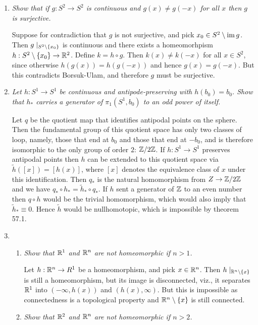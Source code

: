 \documentclass[10pt]{article}
\begin{document}
\begin{enumerate}
\item \emph{Show that if $g: S^2 \rightarrow S^2$ is continuous and $g(x) \neq g(-x)$ for all $x$ then $g$ is surjective.}

Suppose for contradiction that $g$ is not surjective, and pick $x_0 \in S^2 \setminus \operatorname{im} g$.  Then $g \mid_{S^2 \setminus \left\{ x_0 \right\}}$ is continuous and there exists a homeomorhpism $h: S^2 \setminus \left\{ x_0 \right\} \rightarrow \mathbb{R}^2$.  Define $k = h \circ g$.  Then $k(x) \neq k(-x)$ for all $x \in S^2$, since otherwise $h(g(x)) = h(g(-x))$ and hence $g(x) = g(-x)$.  But this contradicts Borsuk-Ulam, and therefore $g$ must be surjective.

\item \emph{Let $h: S^1 \rightarrow S^1$ be continuous and antipode-preserving with $h(b_0) = b_0$.  Show that $h_\ast$ carries a generator of $\pi_1(S^1, b_0)$ to an odd power of itself.}

Let $q$ be the quotient map that identifies antipodal points on the sphere.  Then the fundamental group of this quotient space has only two classes of loop, namely, those that end at $b_0$ and those that end at $-b_0$, and is therefore isomorphic to the only group of order $2$: $\mathbb{Z}/2\mathbb{Z}$.  If $h: S^1 \rightarrow S^1$ preserves antipodal points then $h$ can be extended to this quotient space via $\tilde{h}([x]) = [h(x)]$, where $[x]$ denotes the equivalence class of $x$ under this identification.  Then $q_\ast$ is the natural homomorphism from $Z \rightarrow \mathbb{Z}/2\mathbb{Z}$ and we have $q_\ast \circ h_\ast = \tilde{h}_\ast \circ q_\ast$.  If $h$ sent a generator of $\mathbb{Z}$ to an even number then $q \circ h$ would be the trivial homomorphism, which would also imply that $\tilde{h}_\ast \equiv 0$.  Hence $\tilde{h}$ would be nullhomotopic, which is impossible by theorem 57.1.

\item
\begin{enumerate}
\item \emph{Show that $\mathbb{R}^1$ and $\mathbb{R}^n$ are not homeomorphic if $n > 1$.}

Let $h: \mathbb{R}^n \rightarrow R^1$ be a homeomorphism, and pick $x \in \mathbb{R}^n$.  Then $h \mid_{\mathbb{R}^n \setminus \left\{ x \right\}}$ is still a homeomorphism, but its image is disconnected, viz., it separates $\mathbb{R}^1$ into $(-\infty, h(x))$ and $(h(x), \infty)$.  But this is impossible as connectedness is a topological property and $\mathbb{R}^n \setminus \left\{ x \right\}$ is still connected.

\item \emph{Show that $\mathbb{R}^2$ and $\mathbb{R}^n$ are not homeomorphic if $n > 2$.}


\end{enumerate}
\end{enumerate}
\end{document}
